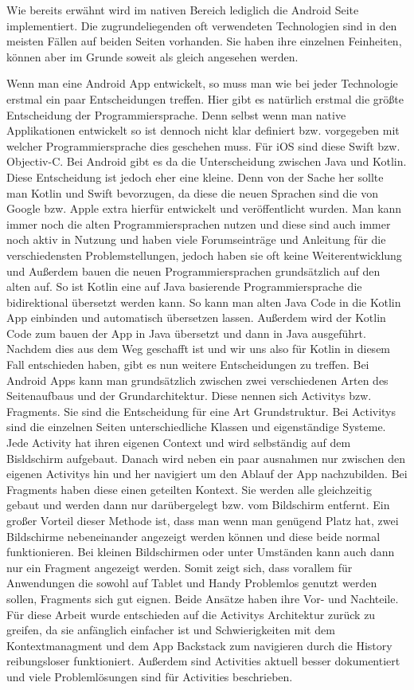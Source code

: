 Wie bereits erwähnt wird im nativen Bereich lediglich die Android Seite implementiert. Die zugrundeliegenden oft verwendeten Technologien sind in den meisten Fällen auf beiden Seiten vorhanden. Sie haben ihre einzelnen Feinheiten, können aber im Grunde soweit als gleich angesehen werden.

Wenn man eine Android App entwickelt, so muss man wie bei jeder Technologie erstmal ein paar Entscheidungen treffen. Hier gibt es natürlich erstmal die größte Entscheidung der Programmiersprache. Denn selbst wenn man native Applikationen entwickelt so ist dennoch nicht klar definiert bzw. vorgegeben mit welcher Programmiersprache dies geschehen muss. Für iOS sind diese Swift bzw. Objectiv-C. Bei Android gibt es da die Unterscheidung zwischen Java und Kotlin. Diese Entscheidung ist jedoch eher eine kleine. Denn von der Sache her sollte man Kotlin und Swift bevorzugen, da diese die neuen Sprachen sind die von Google bzw. Apple extra hierfür entwickelt und veröffentlicht wurden. Man kann immer noch die alten Programmiersprachen nutzen und diese sind auch immer noch aktiv in Nutzung und haben viele Forumseinträge und Anleitung für die verschiedensten Problemstellungen, jedoch haben sie oft keine Weiterentwicklung und  Außerdem bauen die neuen Programmiersprachen grundsätzlich auf den alten auf. So ist Kotlin eine auf Java basierende Programmiersprache die bidirektional übersetzt werden kann. So kann man alten Java Code in die Kotlin App einbinden und automatisch übersetzen lassen. Außerdem wird der Kotlin Code zum bauen der App in Java übersetzt und dann in Java ausgeführt.
Nachdem dies aus dem Weg geschafft ist und wir uns also für Kotlin in diesem Fall entschieden haben, gibt es nun weitere Entscheidungen zu treffen. Bei Android Apps kann man grundsätzlich zwischen zwei verschiedenen Arten des Seitenaufbaus und der Grundarchitektur. 
Diese nennen sich Activitys bzw. Fragments. Sie sind die Entscheidung für eine Art Grundstruktur. Bei Activitys sind die einzelnen Seiten unterschiedliche Klassen und eigenständige Systeme. Jede Activity hat ihren eigenen Context und wird selbständig auf dem Bisldschirm aufgebaut. Danach wird neben ein paar ausnahmen nur zwischen den eigenen Activitys hin und her navigiert um den Ablauf der App nachzubilden.
Bei Fragments haben diese einen geteilten Kontext. Sie werden alle gleichzeitig gebaut und werden dann nur darübergelegt bzw. vom Bildschirm entfernt. Ein großer Vorteil dieser Methode ist, dass man wenn man genügend Platz hat, zwei Bildschirme nebeneinander angezeigt werden können und diese beide normal funktionieren. Bei kleinen Bildschirmen oder unter Umständen kann auch dann nur ein Fragment angezeigt werden. Somit zeigt sich, dass vorallem für Anwendungen die sowohl auf Tablet und Handy Problemlos genutzt werden sollen, Fragments sich gut eignen.
Beide Ansätze haben ihre Vor- und Nachteile.
Für diese Arbeit wurde entschieden auf die Activitys Architektur zurück zu greifen, da sie anfänglich einfacher ist und Schwierigkeiten mit dem Kontextmanagment und dem App Backstack zum navigieren durch die History reibungsloser funktioniert. Außerdem sind Activities aktuell besser dokumentiert und viele Problemlösungen sind für Activities beschrieben.

